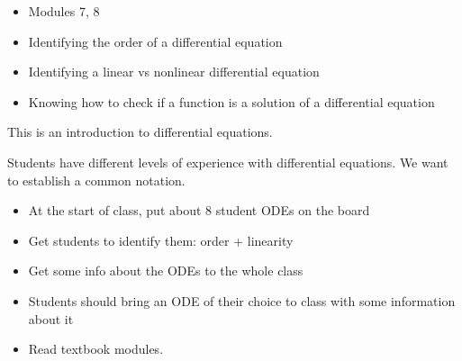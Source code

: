 \begin{lesson}

	\begin{itemize}
		\item Modules 7, 8
	\end{itemize}

	\begin{itemize}
		\item Identifying the order of a differential equation
		\item Identifying a linear vs nonlinear differential equation
		\item Knowing how to check if a function is a solution of a differential equation
	\end{itemize}
	

This is an introduction to differential equations.

Students have different levels of experience with differential equations. We want to establish a common notation.



\begin{annotation}
\begin{goals}
	\begin{itemize}
		\item At the start of class, put about 8 student ODEs on the board
		\item Get students to identify them: order + linearity
		\item Get some info about the ODEs to the whole class
	\end{itemize}
\end{goals}	
\end{annotation}

\begin{itemize}
	\item Students should bring an ODE of their choice to class with some information about it
	\item Read textbook modules.
\end{itemize}




\end{lesson}





